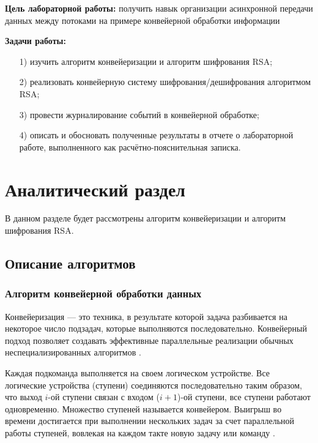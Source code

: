 \documentclass[a4paper,12pt]{article}
\begin{document}
\textbf{Цель лабораторной работы:} получить навык организации асинхронной передачи 
данных между потоками на примере конвейерной обработки информации

\textbf{Задачи работы:}
	
\begin{enumerate} 
\item[1)] изучить алгоритм конвейеризации и алгоритм шифрования RSA;
\item[2)] реализовать конвейерную систему шифрования/дешифрования алгоритмом RSA;
\item[3)] провести журналирование событий в конвейерной обработке;
\item[4)] описать и обосновать полученные результаты в отчете о лабораторной 
работе, выполненного как расчётно-пояснительная записка. 
\end{enumerate} 
\pagebreak

\section{Аналитический раздел}
	
В данном разделе будет рассмотрены алгоритм конвейеризации и алгоритм шифрования RSA.
	
\subsection{Описание алгоритмов}

\subsubsection{Алгоритм конвейерной обработки данных}

Конвейеризация --- это техника, в результате которой  задача
разбивается  на некоторое число подзадач,
которые  выполняются последовательно.
Конвейерный подход позволяет создавать эффективные параллельные реализации обычных 
неспециализированных алгоритмов \cite{iu7}.

Каждая  подкоманда   выполняется на своем логическом  устройстве.
Все     логические    устройства   (ступени)  соединяются последовательно
таким образом, что выход  $i$-ой   ступени   связан   с   
входом   ($i+1$)-ой   ступени,  все ступени  работают  одновременно.  
Множество  ступеней называется    конвейером.    
Выигрыш     во    времени достигается при  выполнении  нескольких задач  
за  счет параллельной   работы   ступеней,  
вовлекая  на  каждом такте новую задачу или команду  \cite{korn}.
\end{document}
